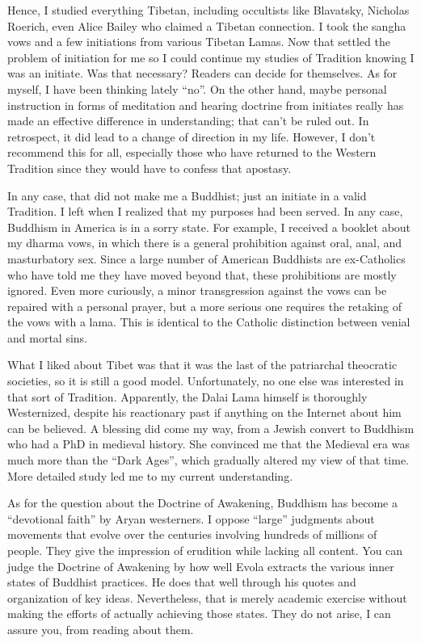 Hence, I studied everything Tibetan, including occultists like Blavatsky, Nicholas Roerich, even Alice Bailey who claimed a Tibetan connection. I took the sangha vows and a few initiations from various Tibetan Lamas. Now that settled the problem of initiation for me so I could continue my studies of Tradition knowing I was an initiate. Was that necessary? Readers can decide for themselves. As for myself, I have been thinking lately ``no''. On the other hand, maybe personal instruction in forms of meditation and hearing doctrine from initiates really has made an effective difference in understanding; that can't be ruled out. In retrospect, it did lead to a change of direction in my life. However, I don't recommend this for all, especially those who have returned to the Western Tradition since they would have to confess that apostasy.

In any case, that did not make me a Buddhist; just an initiate in a valid Tradition. I left when I realized that my purposes had been served. In any case, Buddhism in America is in a sorry state. For example, I received a booklet about my dharma vows, in which there is a general prohibition against oral, anal, and masturbatory sex. Since a large number of American Buddhists are ex-Catholics who have told me they have moved beyond that, these prohibitions are mostly ignored. Even more curiously, a minor transgression against the vows can be repaired with a personal prayer, but a more serious one requires the retaking of the vows with a lama. This is identical to the Catholic distinction between venial and mortal sins.

What I liked about Tibet was that it was the last of the patriarchal theocratic societies, so it is still a good model. Unfortunately, no one else was interested in that sort of Tradition. Apparently, the Dalai Lama himself is thoroughly Westernized, despite his reactionary past if anything on the Internet about him can be believed. A blessing did come my way, from a Jewish convert to Buddhism who had a PhD in medieval history. She convinced me that the Medieval era was much more than the ``Dark Ages'', which gradually altered my view of that time. More detailed study led me to my current understanding.

As for the question about the Doctrine of Awakening, Buddhism has become a ``devotional faith'' by Aryan westerners. I oppose ``large'' judgments about movements that evolve over the centuries involving hundreds of millions of people. They give the impression of erudition while lacking all content. You can judge the Doctrine of Awakening by how well Evola extracts the various inner states of Buddhist practices. He does that well through his quotes and organization of key ideas. Nevertheless, that is merely academic exercise without making the efforts of actually achieving those states. They do not arise, I can assure you, from reading about them.

